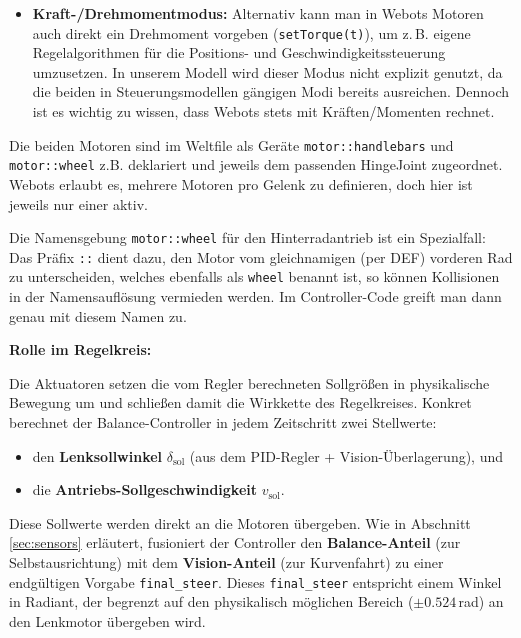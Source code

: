 \begin{itemize}
    \item \textbf{Kraft-/Drehmomentmodus:}  
    Alternativ kann man in Webots Motoren auch direkt ein Drehmoment vorgeben 
    (\texttt{setTorque(t)}), um z.\,B. eigene Regelalgorithmen für die Positions- und Geschwindigkeitssteuerung umzusetzen.  
    In unserem Modell wird dieser Modus nicht explizit genutzt, 
    da die beiden in Steuerungsmodellen gängigen Modi bereits ausreichen.  
    Dennoch ist es wichtig zu wissen, dass Webots stets mit Kräften/Momenten rechnet.
  \end{itemize}


  Die beiden Motoren sind im Weltfile als Geräte \texttt{motor::handlebars} und 
  \texttt{motor::wheel} z.B. deklariert und jeweils dem passenden HingeJoint zugeordnet. 
  Webots erlaubt es, mehrere Motoren pro Gelenk zu definieren, 
  doch hier ist jeweils nur einer aktiv. 

  Die Namensgebung \texttt{motor::wheel} für den Hinterradantrieb ist ein Spezialfall: 
  Das Präfix \texttt{::} dient dazu, den Motor vom gleichnamigen (per DEF) vorderen Rad zu unterscheiden, 
  welches ebenfalls als \texttt{wheel} benannt ist, so können Kollisionen in der Namensauflösung vermieden werden. 
  Im Controller-Code greift man dann genau mit diesem Namen zu.

  \textbf{Rolle im Regelkreis: }

  Die Aktuatoren setzen die vom Regler berechneten Sollgrößen in physikalische Bewegung um 
  und schließen damit die Wirkkette des Regelkreises. 
  Konkret berechnet der Balance-Controller in jedem Zeitschritt zwei Stellwerte:

  \begin{itemize}
    \item den \textbf{Lenksollwinkel} $\delta_{\text{sol}}$ 
    (aus dem PID-Regler + Vision-Überlagerung), und
    \item die \textbf{Antriebs-Sollgeschwindigkeit} $v_{\text{sol}}$.
  \end{itemize}

  Diese Sollwerte werden direkt an die Motoren übergeben. 
  Wie in Abschnitt \ref{sec:sensors} erläutert, fusioniert der Controller den 
  \textbf{Balance-Anteil} (zur Selbstausrichtung) mit dem \textbf{Vision-Anteil} 
  (zur Kurvenfahrt) zu einer endgültigen Vorgabe \texttt{final\_steer}. 
  Dieses \texttt{final\_steer} entspricht einem Winkel in Radiant, 
  der begrenzt auf den physikalisch möglichen Bereich ($\pm 0.524$\,rad) 
  an den Lenkmotor übergeben wird. 

